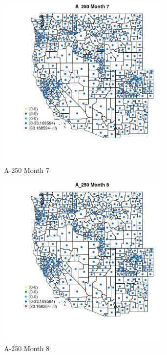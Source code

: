 \begin{figure} 
\centering  
\includegraphics[width=0.77\textwidth]{Code_Outputs/df_report_ML_predictors_CountyCentroid_Locations_Dates_2008-01-01to2018-12-31_MapObsMo7A_250.jpg} 
\caption{\label{fig:df_report_ML_predictors_CountyCentroid_Locations_Dates_2008-01-01to2018-12-31MapObsMo7A_250}A-250 Month 7} 
\end{figure} 
 

\begin{figure} 
\centering  
\includegraphics[width=0.77\textwidth]{Code_Outputs/df_report_ML_predictors_CountyCentroid_Locations_Dates_2008-01-01to2018-12-31_MapObsMo8A_250.jpg} 
\caption{\label{fig:df_report_ML_predictors_CountyCentroid_Locations_Dates_2008-01-01to2018-12-31MapObsMo8A_250}A-250 Month 8} 
\end{figure} 
 


